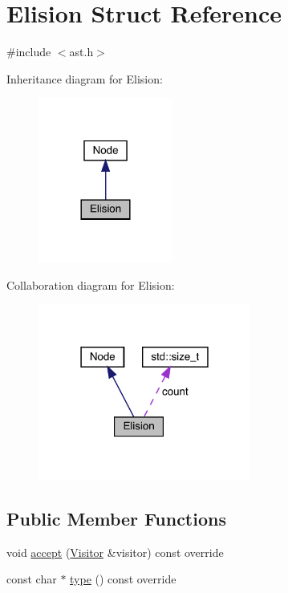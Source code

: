 \hypertarget{struct_elision}{}\section{Elision Struct Reference}
\label{struct_elision}


{\ttfamily \#include $<$ast.\+h$>$}



Inheritance diagram for Elision\+:\nopagebreak
\begin{figure}[H]
\begin{center}
\leavevmode
\includegraphics[width=125pt]{struct_elision__inherit__graph}
\end{center}
\end{figure}


Collaboration diagram for Elision\+:\nopagebreak
\begin{figure}[H]
\begin{center}
\leavevmode
\includegraphics[width=198pt]{struct_elision__coll__graph}
\end{center}
\end{figure}
\subsection*{Public Member Functions}
\begin{DoxyCompactItemize}
\item 
void \hyperlink{struct_elision_ac99f60fccfcedcf9cd090f5682b2e6dd}{accept} (\hyperlink{struct_visitor}{Visitor} \&visitor) const override
\item 
const char $\ast$ \hyperlink{struct_elision_adf289443c761e9ffaec9440510dd21c4}{type} () const override
\end{DoxyCompactItemize}
